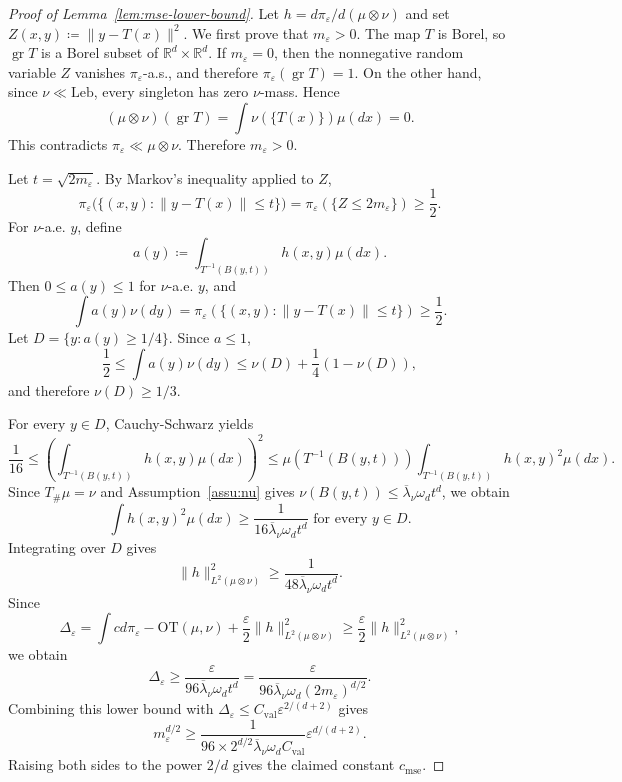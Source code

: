 \documentclass[10pt,a4paper]{amsart}
\newcommand{\Leb}{\mathrm{Leb}}
\newcommand{\OT}{\mathrm{OT}}
\newcommand{\R}{\mathbb{R}}
\DeclareMathOperator{\gr}{gr}
\begin{document}
\begin{proof}[Proof of Lemma~\ref{lem:mse-lower-bound}]
Let $h=d\pi_\varepsilon/d(\mu\otimes\nu)$ and set $Z(x,y)\coloneqq\|y-T(x)\|^2$.
We first prove that $m_\varepsilon>0$. 
The map $T$ is Borel, so $\gr T$ is a Borel subset of $\R^d\times\R^d$. 
If $m_\varepsilon=0$, then the nonnegative random variable $Z$ vanishes $\pi_\varepsilon$-a.s., and therefore $\pi_\varepsilon(\gr T)=1$.
On the other hand, since $\nu\ll\Leb$, every singleton has zero $\nu$-mass.
Hence
\[
(\mu\otimes\nu)(\gr T)=\int\nu(\{T(x)\})\mu(dx)=0.
\]
This contradicts $\pi_\varepsilon\ll\mu\otimes\nu$. 
Therefore $m_\varepsilon>0$.

Let $t=\sqrt{2m_\varepsilon}$. 
By Markov's inequality applied to $Z$,
\[
\pi_\varepsilon\bigl(\{(x,y):\|y-T(x)\|\le t\}\bigr)=\pi_\varepsilon(\{Z\le 2m_\varepsilon\})\ge\frac12.
\]
For $\nu$-a.e. $y$, define
$$
a(y)\coloneqq
\int_{T^{-1}(B(y,t))}h(x,y)\mu(dx).
$$
Then $0\le a(y)\le 1$ for $\nu$-a.e. $y$, and
$$
\int a(y)\nu(dy)
=
\pi_\varepsilon(\{(x,y):\|y-T(x)\|\le t\})
\ge \frac12.
$$
Let $D=\{y:a(y)\ge 1/4\}$. 
Since $a\le 1$,
$$
\frac12
\le
\int a(y)\nu(dy)
\le
\nu(D)+\frac14(1-\nu(D)),
$$
and therefore $\nu(D)\ge 1/3$.

For every $y\in D$, Cauchy-Schwarz yields
$$
\frac{1}{16}
\le
\left(\int_{T^{-1}(B(y,t))}h(x,y)\mu(dx)\right)^2
\le
\mu(T^{-1}(B(y,t)))
\int_{T^{-1}(B(y,t))}h(x,y)^2\mu(dx).
$$
Since $T_\#\mu=\nu$ and Assumption~\ref{assu:nu} gives $\nu(B(y,t))\le\overline\lambda_\nu\omega_dt^d$, we obtain
\[
\int h(x,y)^2\mu(dx)\ge\frac{1}{16\overline\lambda_\nu\omega_dt^d}\text{ for every }y\in D.
\]
Integrating over $D$ gives
$$
\|h\|_{L^2(\mu\otimes\nu)}^2
\ge
\frac{1}{48\overline\lambda_\nu\omega_dt^d}.
$$
Since
$$
\Delta_\varepsilon
=
\int cd\pi_\varepsilon-\OT(\mu,\nu)
+
\frac{\varepsilon}{2}\|h\|_{L^2(\mu\otimes\nu)}^2
\ge
\frac{\varepsilon}{2}\|h\|_{L^2(\mu\otimes\nu)}^2,
$$
we obtain
$$
\Delta_\varepsilon\ge\frac{\varepsilon}{96\overline\lambda_\nu\omega_dt^d}=\frac{\varepsilon}{96\overline\lambda_\nu\omega_d(2m_\varepsilon)^{d/2}}.
$$
Combining this lower bound with $\Delta_\varepsilon\le C_{\mathrm{val}}\varepsilon^{2/(d+2)}$ gives
$$
m_\varepsilon^{d/2}\ge\frac{1}{96\times2^{d/2}\overline\lambda_\nu\omega_d C_{\mathrm{val}}}\varepsilon^{d/(d+2)}.
$$
Raising both sides to the power $2/d$ gives the claimed constant $c_{\mathrm{mse}}$.
\end{proof}
\end{document}
